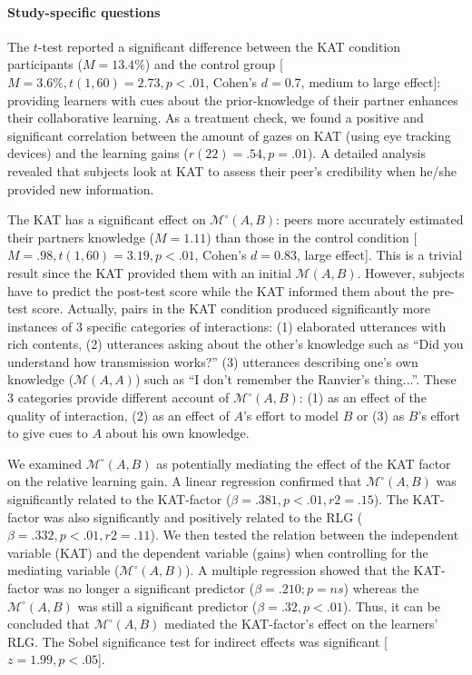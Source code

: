 \documentclass[natbib]{svjour3}
\newcommand{\gmodel}[2]{{$\mathcal{M}(#1, #2)$}}
\newcommand{\gModel}[2]{{$\mathcal{M}^{\circ}(#1, #2)$}}
\begin{document}
\paragraph{Study-specific questions} The $t$-test reported a significant
difference between the KAT condition participants ($M = 13.4\%$) and the control
group [$M = 3.6\%, t(1, 60) = 2.73, p < .01$, Cohen's $d = 0.7$, medium to large
effect]: providing learners with cues about the prior-knowledge of their partner
enhances their collaborative learning. As a treatment check, we found a positive
and significant correlation between the amount of gazes on KAT (using eye
tracking devices) and the learning gains ($r(22) = .54, p = .01$). A detailed
analysis revealed that subjects look at KAT to assess their peer's credibility
when he/she provided new information. 

The KAT has a significant effect on \gModel{A}{B}: peers more accurately
estimated their partners knowledge ($M = 1.11$) than those in the control
condition [$M = .98, t(1, 60) = 3.19, p < .01$, Cohen's $d = 0.83$, large
effect]. This is a trivial result since the KAT provided them with an initial
\gmodel{A}{B}. However, subjects have to predict the post-test score while the
KAT informed them about the pre-test score. Actually, pairs in the KAT condition
produced significantly more instances of 3 specific categories of interactions:
(1) elaborated utterances with rich contents,  (2) utterances asking about the
other's knowledge such as ``Did you understand how transmission works?'' (3)
utterances describing one's own knowledge (\gmodel{A}{A}) such as ``I don't
remember the Ranvier's thing...''. These 3 categories provide different account
of \gModel{A}{B}: (1) as an effect of the quality of interaction, (2) as an
effect of $A$'s effort to model $B$ or (3) as $B$'s effort to give cues to $A$ about his
own knowledge.

We examined \gModel{A}{B} as potentially mediating the effect of the KAT factor
on the relative learning gain. A linear regression confirmed that \gModel{A}{B}
was significantly related to the KAT-factor ($\beta= .381, p < .01, r2 = .15$).
The KAT-factor was also significantly and positively related to the RLG ($\beta=
.332, p < .01, r2 = .11$). We then tested the relation between the independent
variable (KAT) and the dependent variable (gains) when controlling for the
mediating variable (\gModel{A}{B}). A multiple regression showed that the
KAT-factor was no longer a significant predictor ($\beta= .210; p = ns$) whereas
the \gModel{A}{B} was still a significant predictor ($\beta= .32, p < .01$).
Thus, it can be concluded that \gModel{A}{B} mediated the KAT-factor's effect on
the learners' RLG. The Sobel significance test for indirect effects was
significant [$z = 1.99, p < .05$]. 
\end{document}

